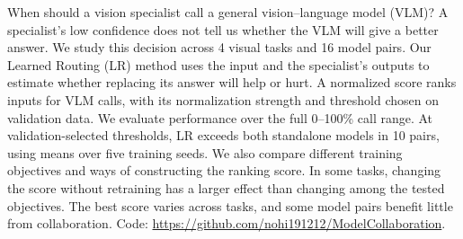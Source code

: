 When should a vision specialist call a general vision--language model (VLM)? A specialist's low confidence does not tell us whether the VLM will give a better answer. We study this decision across 4 visual tasks and 16 model pairs. Our Learned Routing (LR) method uses the input and the specialist's outputs to estimate whether replacing its answer will help or hurt. A normalized score ranks inputs for VLM calls, with its normalization strength and threshold chosen on validation data. We evaluate performance over the full 0--100\% call range. At validation-selected thresholds, LR exceeds both standalone models in 10 pairs, using means over five training seeds. We also compare different training objectives and ways of constructing the ranking score. In some tasks, changing the score without retraining has a larger effect than changing among the tested objectives. The best score varies across tasks, and some model pairs benefit little from collaboration. Code: \url{https://github.com/nohi191212/ModelCollaboration}.
